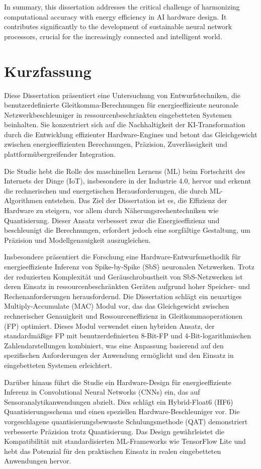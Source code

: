 \documentclass{article}
\begin{document}
	In summary, this dissertation addresses the critical challenge of harmonizing computational accuracy with energy efficiency in AI hardware design. It contributes significantly to the development of sustainable neural network processors, crucial for the increasingly connected and intelligent world.
	
	\newpage
	\section*{Kurzfassung}
	Diese Dissertation präsentiert eine Untersuchung von Entwurfstechniken, die benutzerdefinierte Gleitkomma-Berechnungen für energieeffiziente neuronale Netzwerkbeschleuniger in ressourcenbeschränkten eingebetteten Systemen beinhalten. Sie konzentriert sich auf die Nachhaltigkeit der KI-Transformation durch die Entwicklung effizienter Hardware-Engines und betont das Gleichgewicht zwischen energieeffizienten Berechnungen, Präzision, Zuverlässigkeit und plattformübergreifender Integration.
	
	Die Studie hebt die Rolle des maschinellen Lernens (ML) beim Fortschritt des Internets der Dinge (IoT), insbesondere in der Industrie 4.0, hervor und erkennt die rechnerischen und energetischen Herausforderungen, die durch ML-Algorithmen entstehen. Das Ziel der Dissertation ist es, die Effizienz der Hardware zu steigern, vor allem durch Näherungsrechentechniken wie Quantisierung. Dieser Ansatz verbessert zwar die Energieeffizienz und beschleunigt die Berechnungen, erfordert jedoch eine sorgfältige Gestaltung, um Präzision und Modellgenauigkeit auszugleichen.
	
	Insbesondere präsentiert die Forschung eine Hardware-Entwurfsmethodik für energieeffiziente Inferenz von Spike-by-Spike (SbS) neuronalen Netzwerken. Trotz der reduzierten Komplexität und Geräuschrobustheit von SbS-Netzwerken ist deren Einsatz in ressourcenbeschränkten Geräten aufgrund hoher Speicher- und Rechenanforderungen herausfordernd. Die Dissertation schlägt ein neuartiges Multiply-Accumulate (MAC) Modul vor, das das Gleichgewicht zwischen rechnerischer Genauigkeit und Ressourceneffizienz in Gleitkommaoperationen (FP) optimiert. Dieses Modul verwendet einen hybriden Ansatz, der standardmäßige FP mit benutzerdefinierten 8-Bit-FP und 4-Bit-logarithmischen Zahlendarstellungen kombiniert, was eine Anpassung basierend auf den spezifischen Anforderungen der Anwendung ermöglicht und den Einsatz in eingebetteten Systemen erleichtert.
	
	Darüber hinaus führt die Studie ein Hardware-Design für energieeffiziente Inferenz in Convolutional Neural Networks (CNNs) ein, das auf Sensoranalytikanwendungen abzielt. Dies schlägt ein Hybrid-Float6 (HF6) Quantisierungsschema und einen speziellen Hardware-Beschleuniger vor. Die vorgeschlagene quantisierungsbewusste Schulungsmethode (QAT) demonstriert verbesserte Präzision trotz Quantisierung. Das Design gewährleistet die Kompatibilität mit standardisierten ML-Frameworks wie TensorFlow Lite und hebt das Potenzial für den praktischen Einsatz in realen eingebetteten Anwendungen hervor.
	
\end{document}
